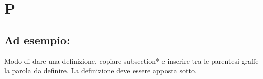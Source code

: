 \section*{P}
\markright{}
\subsection*{Ad esempio:}
Modo di dare una definizione, copiare subsection*{} e inserire tra le parentesi graffe la parola da definire. La definizione deve essere apposta sotto.